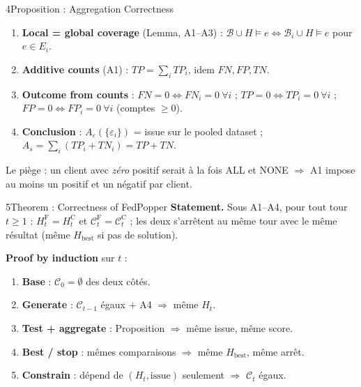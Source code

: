 \documentclass[10pt]{article}
\begin{document}
\begin{minipage}[t]{0.5\textwidth}
\begin{bloc}{\num{4}Proposition : Aggregation Correctness}
\begin{enumerate}[leftmargin=12pt, itemsep=1pt, topsep=1pt]
  \item \textbf{Local = global coverage} (Lemma, A1--A3) : $\mathcal{B}\cup H\models e\iff\mathcal{B}_i\cup H\models e$ pour $e\in E_i$.
  \item \textbf{Additive counts} (A1) : $TP=\sum_i TP_i$, idem $FN,FP,TN$.
  \item \textbf{Outcome from counts} : $FN=0\iff FN_i=0\ \forall i$ ; $TP=0\iff TP_i=0\ \forall i$ ; $FP=0\iff FP_i=0\ \forall i$ (comptes $\ge 0$).
  \item \textbf{Conclusion} : $A_\varepsilon(\{\varepsilon_i\})$ = issue sur le pooled dataset ; $A_s=\sum_i(TP_i+TN_i)=TP+TN$.
\end{enumerate}
\begin{astuce}
Le piège : un client avec \emph{zéro} positif serait à la fois ALL et NONE $\Rightarrow$ A1 impose au moins un positif et un négatif par client.
\end{astuce}
\end{bloc}
\end{minipage}\hfill
\begin{minipage}[t]{0.48\textwidth}
\begin{bloc}{\num{5}Theorem : Correctness of FedPopper}
\textbf{Statement.} Sous A1--A4, pour tout tour $t\ge1$ : $H_t^{\mathrm F}=H_t^{\mathrm C}$ et $\mathcal{C}_t^{\mathrm F}=\mathcal{C}_t^{\mathrm C}$ ; les deux s'arrêtent au même tour avec le même résultat (même $H_{\text{best}}$ si pas de solution).\par\vspace{2pt}
\textbf{Proof by induction} sur $t$ :
\begin{enumerate}[leftmargin=12pt, itemsep=1pt, topsep=1pt]
  \item \textbf{Base} : $\mathcal{C}_0=\emptyset$ des deux côtés.
  \item \textbf{Generate} : $\mathcal{C}_{t-1}$ égaux + A4 $\Rightarrow$ même $H_t$.
  \item \textbf{Test + aggregate} : Proposition $\Rightarrow$ même issue, même score.
  \item \textbf{Best / stop} : mêmes comparaisons $\Rightarrow$ même $H_{\text{best}}$, même arrêt.
  \item \textbf{Constrain} : dépend de $(H_t,\text{issue})$ seulement $\Rightarrow$ $\mathcal{C}_t$ égaux.
\end{enumerate}
\end{bloc}
\end{minipage}
\end{document}
